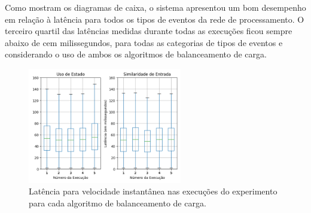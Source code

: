 

  Como mostram os diagramas de caixa, o sistema apresentou um bom desempenho em relação à latência para todos os tipos de eventos da rede de processamento. 
  O terceiro quartil das latências medidas durante todas as execuções ficou sempre abaixo de cem milissegundos, para todas as categorias de tipos de eventos e considerando o uso de ambos os algoritmos de balanceamento de carga.
  


\begin{figure}[h!]
\centering
 \includegraphics[width=0.6\textwidth]{figuras/graphics/boxplot_agg_vf.png}
 \caption{Latência para velocidade instantânea nas execuções do experimento para cada algoritmo de balanceamento de carga.}
 \label{fig:boxplot_vf_agg_1}
\end{figure}


